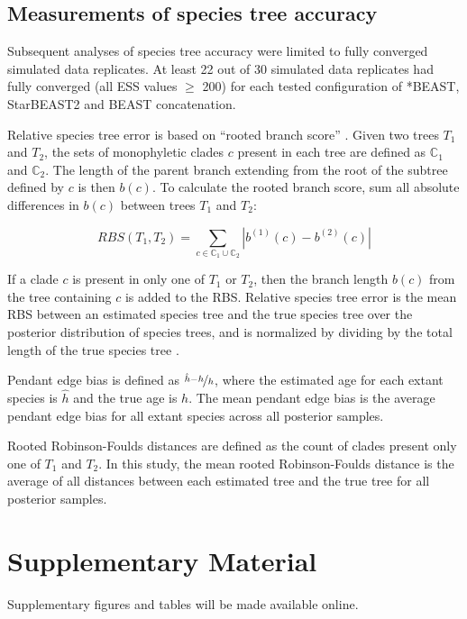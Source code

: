 \documentclass[12pt]{article}
\begin{document}
\subsection{Measurements of species tree accuracy}

Subsequent analyses of species tree accuracy were limited to fully converged
simulated data replicates. At least 22 out of 30 simulated data replicates had
fully converged (all ESS values $\ge$ 200) for each tested configuration of
*BEAST, StarBEAST2 and BEAST concatenation.

Relative species tree error is based on ``rooted branch score''
\citep[RBS;][]{Heled2013}. Given two trees $T_1$ and $T_2$, the sets of
monophyletic clades $c$ present in each tree are defined as $\mathbb{C}_1$ and
$\mathbb{C}_2$. The length of the parent branch extending from the root of the
subtree defined by $c$ is then $b(c)$. To calculate the rooted branch score, sum
all absolute differences in $b(c)$ between trees $T_1$ and $T_2$:

\begin{equation}
RBS(T_1, T_2) = \sum_{c \in {\mathbb{C}_1} \cup {\mathbb{C}_2}} |b^{(1)}(c) - b^{(2)}(c)|
\end{equation}

If a clade $c$ is present in only one of $T_1$ or $T_2$, then the branch length
$b(c)$ from the tree containing $c$ is added to the RBS. Relative species tree
error is the mean RBS between an estimated species tree and the true
species tree over the posterior distribution of species trees, and is normalized
by dividing by the total length of the true species tree
\citep{Ogilvie01052016}.

Pendant edge bias is defined as $\nicefrac{\hat{h} - h}{h}$, where the estimated
age for each extant species is $\hat{h}$ and the true age is $h$. The mean
pendant edge bias is the average pendant edge bias for all extant species across
all posterior samples.

Rooted Robinson-Foulds distances \citep{ROBINSON1981131} are defined as the
count of clades present only one of $T_1$ and $T_2$. In this study, the mean
rooted Robinson-Foulds distance is the average of all distances between each
estimated tree and the true tree for all posterior samples.

\section{Supplementary Material}
Supplementary figures and tables will be made available online.
\end{document}
